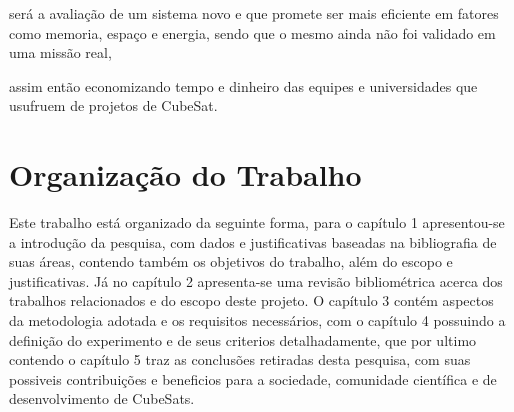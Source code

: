 será a avaliação de um sistema novo e que promete ser mais 
eficiente em fatores como memoria, espaço e energia, sendo que o mesmo ainda não foi validado em uma missão 
real, 



assim então economizando tempo e dinheiro das equipes e universidades que usufruem de projetos de CubeSat.


\section{Organização do Trabalho}
Este trabalho está organizado da seguinte forma, para o capítulo 1 apresentou-se a introdução da 
pesquisa, com dados e justificativas baseadas na bibliografia de suas áreas, contendo 
também os objetivos do trabalho, além do escopo e justificativas. Já no capítulo 2 apresenta-se 
uma revisão bibliométrica acerca dos trabalhos relacionados e do escopo deste projeto. O 
capítulo 3 contém aspectos da metodologia adotada e os requisitos necessários, com o capítulo 
4 possuindo a definição do experimento e de seus criterios detalhadamente, que por ultimo 
contendo o capítulo 5 traz as conclusões retiradas desta pesquisa, com suas possiveis contribuições 
e beneficios para a sociedade, comunidade científica e de desenvolvimento de CubeSats.


